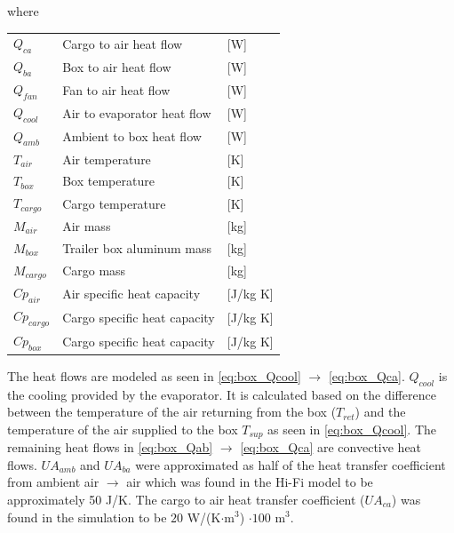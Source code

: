 where
\begin{center}
	\begin{tabular}{l p{8cm} l}
		$Q_{ca}$     & Cargo to air heat flow       & [\si{W}]                \\
		$Q_{ba}$     & Box to air heat flow         & [\si{W}]                \\
		$Q_{fan}$    & Fan to air heat flow         & [\si{W}]                \\
		$Q_{cool}$   & Air to evaporator heat flow  & [\si{W}]                \\
		$Q_{amb}$    & Ambient to box heat flow     & [\si{W}]                \\
		$T_{air}$    & Air temperature              & [\si{K}]                \\
		$T_{box}$    & Box temperature              & [\si{K}]                \\
		$T_{cargo}$  & Cargo temperature            & [\si{K}]                \\
		$M_{air}$    & Air mass                     & [\si{kg}]               \\
		$M_{box}$    & Trailer box aluminum mass    & [\si{kg}]               \\
		$M_{cargo}$  & Cargo mass                   & [\si{kg}]               \\
		$Cp_{air}$   & Air specific heat capacity   & [\si{J}/\si{kg} \si{K}] \\
		$Cp_{cargo}$ & Cargo specific heat capacity & [\si{J}/\si{kg} \si{K}] \\
		$Cp_{box}$   & Cargo specific heat capacity & [\si{J}/\si{kg} \si{K}]
	\end{tabular}
\end{center}


The heat flows are modeled as seen in \cref{eq:box_Qcool} $\rightarrow$ \cref{eq:box_Qca}. $Q_{cool}$ is the cooling provided by the evaporator. It is calculated based on the difference between the temperature of the air returning from the box ($T_{ret}$) and the temperature of the air supplied to the box $T_{sup}$ as seen in \cref{eq:box_Qcool}. The remaining heat flows in \cref{eq:box_Qab} $\rightarrow$ \cref{eq:box_Qca} are convective heat flows. $U A_{amb}$ and $U A_{ba}$ were approximated as half of the heat transfer coefficient from ambient air $\rightarrow$ air which was found in the Hi-Fi model to be approximately 50 \si{J}/\si{K}. The cargo to air heat transfer coefficient ($U A_{ca}$) was found in the simulation to be $20$ \si{W}/(\si{K}$\cdot$\si{m}$^3$) $\cdot 100$ \si{m}$^3$.


